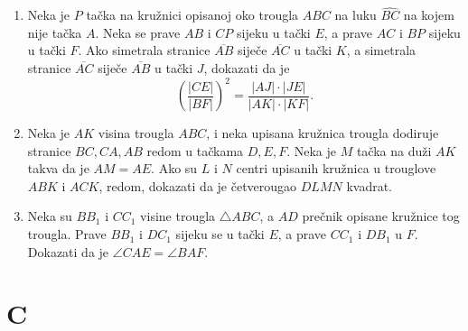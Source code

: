 \documentclass{article}
\begin{document}
\begin{enumerate}
    \item Neka je $P$ ta\v{c}ka na kru\v{z}nici opisanoj oko trougla $ABC$ na luku $\widehat{BC}$ na kojem nije ta\v{c}ka $A$. Neka se prave $AB$ i $CP$ sijeku u ta\v{c}ki $E$, a prave $AC$ i $BP$ sijeku u ta\v{c}ki $F$. Ako simetrala stranice $\overline{AB}$ sije\v{c}e $\overline{AC}$ u ta\v{c}ki $K$, a simetrala stranice $\overline{AC}$ sije\v{c}e $\overline{AB}$ u ta\v{c}ki $J$, dokazati da je
    \[
    \left(\frac{|CE|}{|BF|}\right)^2 = \frac{|AJ| \cdot |JE|}{|AK| \cdot |KF|}.
    \]

    \item Neka je $AK$ visina trougla $ABC$, i neka upisana kru\v{z}nica trougla dodiruje stranice $BC, CA, AB$ redom u ta\v{c}kama $D, E, F$. Neka je $M$ ta\v{c}ka na du\v{z}i $AK$ takva da je $AM = AE$. Ako su $L$ i $N$ centri upisanih kru\v{z}nica u trouglove $ABK$ i $ACK$, redom, dokazati da je \v{c}etverougao $DLMN$ kvadrat.

    \item Neka su $BB_1$ i $CC_1$ visine trougla $\triangle ABC$, a $AD$ pre\v{c}nik opisane kru\v{z}nice tog trougla. Prave $BB_1$ i $DC_1$ sijeku se u ta\v{c}ki $E$, a prave $CC_1$ i $DB_1$ u $F$. Dokazati da je $\angle CAE = \angle BAF$.
\end{enumerate}

\section{C}
\end{document}
